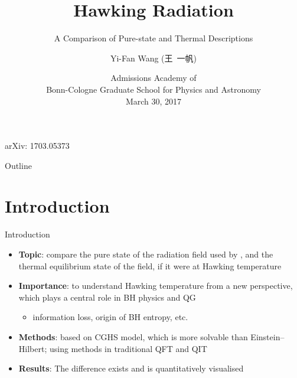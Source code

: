 \documentclass{beamer}
\title%
{Hawking Radiation}
\subtitle{A Comparison of Pure-state and Thermal Descriptions}
\author[Wang] %
{Yi-Fan Wang (王\ 一帆)}
\institute[Uni zu Köln, Uni Bonn] %
{
  Institut für Theoretische Physik, Universität zu Köln
  \and
  Rheinische Friedrich-Wilhelms-Universität Bonn}
\date[BCGS Admission 2017]
{Admissions Academy of\\Bonn-Cologne Graduate School for Physics and 
Astronomy\\March 30, 2017}
\begin{document}
\begin{frame}
  \titlepage
  arXiv: 1703.05373
\end{frame}

\begin{frame}{Outline}
  \tableofcontents
\end{frame}





\section{Introduction}

\begin{frame}{Introduction}
\begin{itemize}
\item \textbf{Topic}: compare the \alert{pure state} of the radiation field 
used by \citeauthor{HAWKING1974}, and the \alert{thermal equilibrium state} of 
the field, if it were at Hawking temperature
\item \textbf{Importance}: to understand Hawking temperature from a new 
perspective, which plays a central role in BH physics and QG
\begin{itemize}
\item information loss, origin of BH entropy, etc.\
\end{itemize}
\item \textbf{Methods}: based on CGHS model, which is more solvable than 
Einstein--Hilbert; using methods in traditional QFT and QIT
\item \textbf{Results}: The difference exists and is quantitatively visualised
\end{itemize}

\end{frame}
\end{document}
